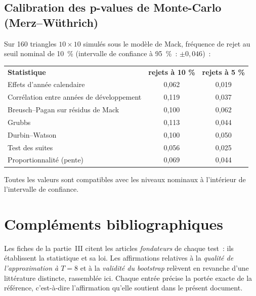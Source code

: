 \documentclass[a4paper,11pt]{article}
\begin{document}
\subsection{Calibration des p-values de Monte-Carlo (Merz--Wüthrich)}

Sur 160 triangles $10\times10$ simulés sous le modèle de Mack, fréquence de rejet
au seuil nominal de 10~\% (intervalle de confiance à 95~\%~: $\pm 0{,}046$)~:

\begin{center}
\small
{}
\begin{tabular}{@{}p{6.4cm}cc@{}}
\rowcolor{tableheader}
\textcolor{financeblue}{\textbf{Statistique}} &
\textcolor{financeblue}{\textbf{rejets à 10 \%}} &
\textcolor{financeblue}{\textbf{rejets à 5 \%}} \\
Effets d'année calendaire & 0,062 & 0,019 \\
Corrélation entre années de développement & 0,119 & 0,037 \\
Breusch--Pagan sur résidus de Mack & 0,100 & 0,062 \\
Grubbs & 0,113 & 0,044 \\
Durbin--Watson & 0,100 & 0,050 \\
Test des suites & 0,056 & 0,025 \\
Proportionnalité (pente) & 0,069 & 0,044 \\
\end{tabular}
\end{center}

\noindent
Toutes les valeurs sont compatibles avec les niveaux nominaux à l'intérieur de
l'intervalle de confiance.



\clearpage
\section{Compléments bibliographiques}
\label{sec:biblio}

Les fiches de la partie~III citent les articles \emph{fondateurs} de chaque
test~: ils établissent la statistique et sa loi. Les affirmations relatives à la
\emph{qualité de l'approximation à $T = 8$} et à la \emph{validité du bootstrap}
relèvent en revanche d'une littérature distincte, rassemblée ici. Chaque entrée
précise la portée exacte de la référence, c'est-à-dire l'affirmation qu'elle
soutient dans le présent document.
\end{document}
